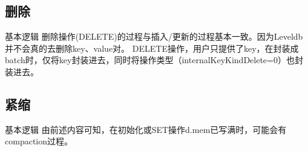 \documentclass[CJK, 8pt]{beamer}
\begin{document}
\begin{CJK*}{UTF8}{gkai}
\subsection{删除}
\begin{frame}{基本逻辑}
删除操作(DELETE)的过程与插入/更新的过程基本一致。因为Leveldb并不会真的去删除key、value对。
DELETE操作，用户只提供了key，在封装成batch时，仅将key封装进去，同时将操作类型（internalKeyKindDelete=0）也封装进去。
\end{frame}

\subsection{紧缩}
\begin{frame}{基本逻辑}
由前述内容可知，在初始化或SET操作d.mem已写满时，可能会有compaction过程。


\end{frame}
\end{CJK*}
\end{document}
